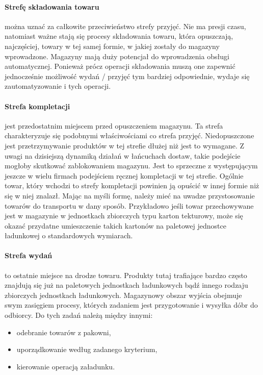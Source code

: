		\paragraph{Strefę składowania towaru} można uznać za całkowite przeciwieństwo strefy przyjęć. Nie ma presji czasu, 
		natomiast ważne stają się procesy składowania towaru, która opuszczają, najczęściej, towary w tej samej formie,
		w jakiej zostały do magazyny wprowadzone. Magazyny mają duży potencjał do wprowadzenia obsługi automatycznej. 
		Ponieważ prócz operacji składowania muszą one zapewnić jednocześnie możliwość wydań / przyjęć tym bardziej odpowiednie,
		wydaje się zautomatyzowanie i tych operacji. 
		\paragraph{Strefa kompletacji} jest przedostatnim miejscem przed opuszczeniem magazynu. Ta strefa charakteryzuje się
		podobnymi właściwościami co strefa przyjęć. Niedopuszczone jest przetrzymywanie produktów w tej strefie dłużej niż jest 
		to wymagane. Z uwagi na dzisiejszą dynamiką działań w łańcuchach dostaw, takie podejście mogłoby skutkować zablokowaniem
		magazynu. Jest to sprzeczne z występującym jeszcze w wielu firmach podejściem ręcznej kompletacji w tej strefie. Ogólnie
		towar, który wchodzi to strefy kompletacji powinien ją opuścić w innej formie niż się w niej znalazł. Mając na myśli formę,
		należy mieć na uwadze przystosowanie towarów do transportu w dany sposób. Przykładowo jeśli towar przechowywane jest w magazynie
		w jednostkach zbiorczych typu karton tekturowy, może się okazać przydatne umieszczenie takich kartonów na paletowej 
		jednostce ładunkowej o standardowych wymiarach. 
		\paragraph{Strefa wydań} to ostatnie miejsce na drodze towaru. Produkty tutaj trafiające bardzo często znajdują się już
		na paletowych jednostkach ładunkowych bądź innego rodzaju zbiorczych jednostkach ładunkowych. Magazynowy
		obszar wyjścia obejmuje swym zasięgiem procesy, których zadaniem jest przygotowanie i wysyłka dóbr do odbiorcy. 
		Do tych zadań należą między innymi:
		\begin{itemize}
			\item odebranie towarów z pakowni,
			\item uporządkowanie według zadanego kryterium,
			\item kierowanie operacją załadunku.
		\end{itemize}
		
